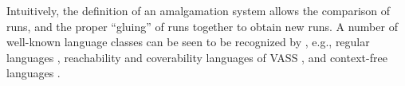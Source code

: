 Intuitively, the definition of an amalgamation system allows the comparison of
runs, and the proper ``gluing'' of runs together to obtain new runs. A number
of well-known language classes can be seen to be recognized by , e.g., regular languages \cite[Theorem 5.3]{ASZZ24}, reachability and
coverability languages of VASS \cite[Theorem 5.5]{ASZZ24}, and context-free
languages \cite[Theorem 5.10]{ASZZ24}. 

%
%
%    
